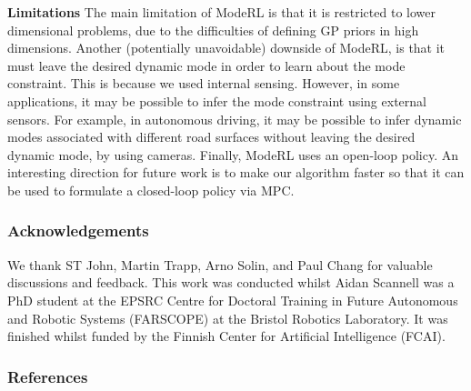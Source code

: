 \documentclass[twoside]{article}
\newcommand{\numData}{\ensuremath{t}}
\newcommand{\modeInd}{\ensuremath{k}}
\newcommand{\mode}[1]{\ensuremath{#1_{\modeInd}}}
\newcommand{\x}{\ensuremath{\mathbf{x}}}
\newcommand{\singleInput}{\ensuremath{\x_{\numData-1}}}
\begin{document}
\textbf{Limitations}
The main limitation of ModeRL is that it is restricted to lower dimensional problems,
due to the difficulties of defining GP priors in high dimensions.
Another (potentially unavoidable) downside of ModeRL,
is that it must leave the desired dynamic mode in order to learn about the mode constraint.
This is because we used internal sensing.
However, in some applications, it may be possible to infer the mode constraint using external sensors.
For example, in autonomous driving, it may be possible to infer dynamic modes associated with different road surfaces
without leaving the desired dynamic mode, by using cameras.
Finally, ModeRL uses an open-loop policy.
An interesting direction for future work is to make our algorithm faster so that it can be used to formulate a closed-loop policy via MPC.


\subsubsection*{Acknowledgements}
We thank ST John, Martin Trapp, Arno Solin, and Paul Chang for valuable discussions and feedback.
This work was conducted whilst Aidan Scannell was a PhD student at the EPSRC Centre for Doctoral
Training in Future Autonomous and Robotic Systems (FARSCOPE) at the Bristol Robotics Laboratory.
It was finished whilst funded by the Finnish Center for Artificial Intelligence (FCAI).
\subsubsection*{References}
\printbibliography[heading=none]

\renewcommand{\gatingKernelnM}{\ensuremath{\mode{\hat{k}}(\singleInput, \gatingInducingInput)}}
\renewcommand{\gatingKernelMM}{\ensuremath{\mode{\hat{k}}(\gatingInducingInput, \gatingInducingInput)}}
\renewcommand{\gatingKernelMn}{\ensuremath{\mode{\hat{k}}(\gatingInducingInput, \singleInput)}}
\renewcommand{\gatingKernelnn}{\ensuremath{\mode{\hat{k}}(\singleInput, \singleInput)}}

\renewcommand{\expertKernelnM}{\ensuremath{\mode{k}(\singleInput, \gatingInducingInput)}}
\renewcommand{\expertKernelMM}{\ensuremath{\mode{k}(\gatingInducingInput, \gatingInducingInput)}}
\renewcommand{\expertKernelMn}{\ensuremath{\mode{k}(\gatingInducingInput, \singleInput)}}
\renewcommand{\expertKernelnn}{\ensuremath{\mode{k}(\singleInput, \singleInput)}}

\appendix

\onecolumn
\end{document}
